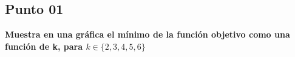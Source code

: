 \subsection*{Punto 01}

\textbf{Muestra en una gráfica el mínimo de la función objetivo como una función de k, para $k \in \{2, 3, 4, 5, 6\}$}